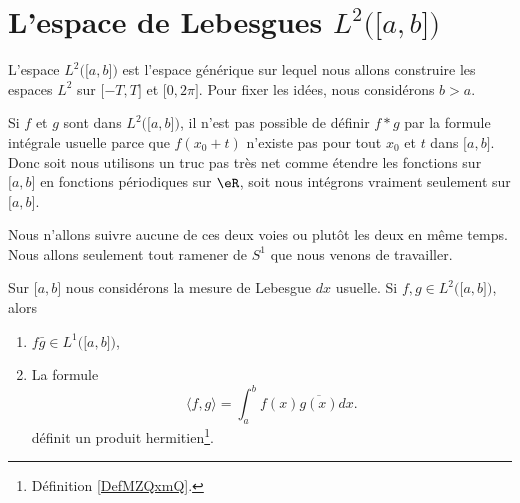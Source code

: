 \section{L'espace de Lebesgues \( L^2\big( \mathopen[ a , b \mathclose] \big)\)}
\label{SECooUMEPooPMemJz}

L'espace \( L^2\big( \mathopen[ a , b \mathclose] \big)\) est l'espace générique sur lequel nous allons construire les espaces \( L^2\) sur \( \mathopen[ -T , T \mathclose]\) et \( \mathopen[ 0 , 2\pi \mathclose]\). Pour fixer les idées, nous considérons \( b>a\).

Si \( f\) et \( g\) sont dans \( L^2\big( \mathopen[ a , b \mathclose] \big)\), il n'est pas possible de définir \( f*g\) par la formule intégrale usuelle parce que \( f(x_0+t)\) n'existe pas pour tout \( x_0\) et \( t\) dans \( \mathopen[ a , b \mathclose]\). Donc soit nous utilisons un truc pas très net comme étendre les fonctions sur \( \mathopen[ a , b \mathclose]\) en fonctions périodiques sur \( \eR\), soit nous intégrons vraiment seulement sur \( \mathopen[ a , b \mathclose]\).

Nous n'allons suivre aucune de ces deux voies ou plutôt les deux en même temps. Nous allons seulement tout ramener de \( S^1\) que nous venons de travailler.

\begin{propositionDef}
	Sur \( \mathopen[ a , b \mathclose]\) nous considérons la mesure de Lebesgue \( dx\) usuelle. Si \( f,g\in L^2\big( \mathopen[ a , b \mathclose] \big)\), alors
	\begin{enumerate}
		\item
		      \( f\bar g\in L^1\big( \mathopen[ a , b \mathclose] \big)\),
		\item
		      La formule
		      \begin{equation}    \label{EQooCRSXooPEopzm}
			      \langle f, g\rangle =\int_a^bf(x)\overline{ g(x) }dx.
		      \end{equation}
		      définit un produit hermitien\footnote{Définition \ref{DefMZQxmQ}.}.
	\end{enumerate}
\end{propositionDef}

